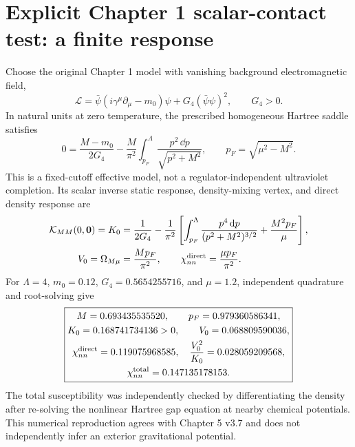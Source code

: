 \documentclass[11pt,a4paper]{article}
\begin{document}
\section{Explicit Chapter 1 scalar-contact test: a finite response}
Choose the original Chapter 1 model with vanishing background electromagnetic field,
\begin{equation}\label{eq:micro}
\boxed{\mathcal L=\bar\psi(i\gamma^\mu\partial_\mu-m_0)\psi+G_4(\bar\psi\psi)^2,\qquad G_4>0.}
\end{equation}
In natural units at zero temperature, the prescribed homogeneous Hartree saddle satisfies
\begin{equation}\label{eq:gap}
0=\frac{M-m_0}{2G_4}-\frac M{\pi^2}\int_{p_F}^{\Lambda}\frac{p^2\,\dd p}{\sqrt{p^2+M^2}},\qquad p_F=\sqrt{\mu^2-M^2}.
\end{equation}
This is a fixed-cutoff effective model, not a regulator-independent ultraviolet completion. Its scalar inverse static response, density-mixing vertex, and direct density response are
\begin{align}
\mathcal K_{MM}(0,\bm0)=K_0&=\frac1{2G_4}-\frac1{\pi^2}\left[\int_{p_F}^{\Lambda}\frac{p^4\,\mathrm d p}{(p^2+M^2)^{3/2}}+\frac{M^2p_F}{\mu}\right],\label{eq:K0}\\
V_0=\Omega_{M\mu}&=\frac{Mp_F}{\pi^2},\qquad \chi^{\rm direct}_{nn}=\frac{\mu p_F}{\pi^2}.\label{eq:V0}
\end{align}
For $\Lambda=4$, $m_0=0.12$, $G_4=0.5654255716$, and $\mu=1.2$, independent quadrature and root-solving give
\begin{equation}\label{eq:bench}
\boxed{\begin{gathered}
M=0.693435535520,\qquad p_F=0.979360586341,\\
K_0=0.168741734136>0,\qquad V_0=0.068809590036,\\
\chi^{\rm direct}_{nn}=0.119075968585,\quad \frac{V_0^2}{K_0}=0.028059209568,\\
\chi_{nn}^{\rm total}=0.147135178153.
\end{gathered}}
\end{equation}
The total susceptibility was independently checked by differentiating the density after re-solving the nonlinear Hartree gap equation at nearby chemical potentials. This numerical reproduction agrees with Chapter 5 v3.7 and does not independently infer an exterior gravitational potential.
\end{document}
